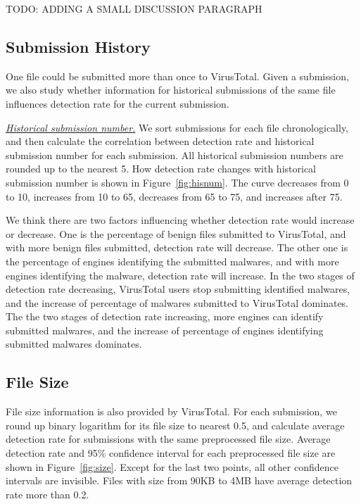 {\color{red} TODO: ADDING A SMALL DISCUSSION PARAGRAPH}

\subsection{Submission History}
\label{sec:history}


One file could be submitted more than once to VirusTotal. 
Given a submission, we also study whether information for historical submissions of the same file influences detection rate for the current submission. 

{\textit{\underline{Historical submission number.}}}
We sort submissions for each file chronologically, and then calculate the correlation between detection rate and historical submission number for each submission. 
All historical submission numbers are rounded up to the nearest 5. 
How detection rate changes with historical submission number is shown in Figure~\ref{fig:hisnum}. 
The curve decreases from 0 to 10, increases from 10 to 65, decreases from 65 to 75, and increases after 75. 

We think there are two factors influencing whether detection rate would increase or decrease.
One is the percentage of benign files submitted to VirusTotal, 
and with more benign files submitted, detection rate will decrease.   
The other one is the percentage of engines identifying the submitted malwares, 
and with more engines identifying the malware, detection rate will increase. 
In the two stages of detection rate decreasing, 
VirusTotal users stop submitting identified malwares, 
and the increase of percentage of malwares submitted to VirusTotal dominates. 
The the two stages of detection rate increasing, 
more engines can identify submitted malwares, 
and the increase of percentage of engines identifying submitted malwares dominates. 


\subsection{File Size}
\label{sec:size}


File size information is also provided by VirusTotal. 
For each submission, we round up binary logarithm for its file size to nearest 0.5,
and calculate average detection rate for submissions with the same preprocessed file size.
Average detection rate and 95\% confidence interval for each preprocessed file size are shown in Figure~\ref{fig:size}.
Except for the last two points, all other confidence intervals are invisible.   
Files with size from 90KB to 4MB have average detection rate more than 0.2. 

